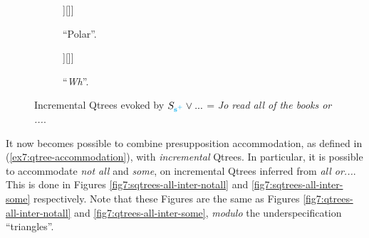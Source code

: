 \begin{figure}[H]
	\centering
	\begin{subfigure}[b]{.45\linewidth}
		\centering
		\begin{forest}
			[CS[$\neg\forall$[?,roof]][\fbox{$\forall$}]]
		\end{forest}
		\caption[]{``Polar''.}\label{fig7:sqtree-all-polar}
	\end{subfigure}
	\hfill
	\begin{subfigure}[b]{.45\linewidth}
		\centering
		\begin{forest}
			[CS[$\neg\exists$][$\exists\wedge\neg\forall$[?,roof]][\fbox{$\forall$}]]
		\end{forest}
		\caption[]{``\textit{Wh}''.}\label{fig7:sqtree-all-wh}
	\end{subfigure}
	\caption[]{Incremental Qtrees evoked by $S_{\textbf{\textcolor{cyan}{s$^+$}}} \vee ...$ = \textit{Jo read all of the books or ...}. }\label{fig7:sqtrees-all}
\end{figure}

It now becomes possible to combine presupposition accommodation, as defined in (\ref{ex7:qtree-accommodation}), with \textit{incremental} Qtrees. In particular, it is possible to accommodate \textit{not all} and \textit{some}, on incremental Qtrees inferred from \textit{all or...}. This is done in Figures \ref{fig7:sqtrees-all-inter-notall} and \ref{fig7:sqtrees-all-inter-some} respectively. Note that these Figures are the same as Figures \ref{fig7:qtrees-all-inter-notall} and \ref{fig7:qtrees-all-inter-some}, \textit{modulo} the underspecification ``triangles''.

